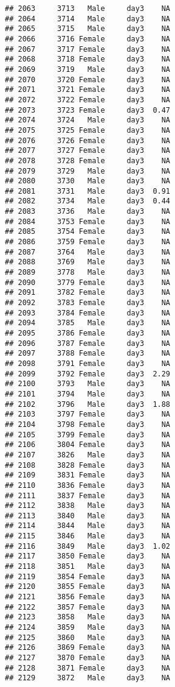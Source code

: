 \documentclass[
]{article}
\begin{document}
\begin{verbatim}
## 2063     3713   Male     day3    NA
## 2064     3714   Male     day3    NA
## 2065     3715   Male     day3    NA
## 2066     3716 Female     day3    NA
## 2067     3717 Female     day3    NA
## 2068     3718 Female     day3    NA
## 2069     3719   Male     day3    NA
## 2070     3720 Female     day3    NA
## 2071     3721 Female     day3    NA
## 2072     3722 Female     day3    NA
## 2073     3723 Female     day3  0.47
## 2074     3724   Male     day3    NA
## 2075     3725 Female     day3    NA
## 2076     3726 Female     day3    NA
## 2077     3727 Female     day3    NA
## 2078     3728 Female     day3    NA
## 2079     3729   Male     day3    NA
## 2080     3730   Male     day3    NA
## 2081     3731   Male     day3  0.91
## 2082     3734   Male     day3  0.44
## 2083     3736   Male     day3    NA
## 2084     3753 Female     day3    NA
## 2085     3754 Female     day3    NA
## 2086     3759 Female     day3    NA
## 2087     3764   Male     day3    NA
## 2088     3769   Male     day3    NA
## 2089     3778   Male     day3    NA
## 2090     3779 Female     day3    NA
## 2091     3782 Female     day3    NA
## 2092     3783 Female     day3    NA
## 2093     3784 Female     day3    NA
## 2094     3785   Male     day3    NA
## 2095     3786 Female     day3    NA
## 2096     3787 Female     day3    NA
## 2097     3788 Female     day3    NA
## 2098     3791 Female     day3    NA
## 2099     3792 Female     day3  2.29
## 2100     3793   Male     day3    NA
## 2101     3794   Male     day3    NA
## 2102     3796   Male     day3  1.88
## 2103     3797 Female     day3    NA
## 2104     3798 Female     day3    NA
## 2105     3799 Female     day3    NA
## 2106     3804 Female     day3    NA
## 2107     3826   Male     day3    NA
## 2108     3828 Female     day3    NA
## 2109     3831 Female     day3    NA
## 2110     3836 Female     day3    NA
## 2111     3837 Female     day3    NA
## 2112     3838   Male     day3    NA
## 2113     3840   Male     day3    NA
## 2114     3844   Male     day3    NA
## 2115     3846   Male     day3    NA
## 2116     3849   Male     day3  1.02
## 2117     3850 Female     day3    NA
## 2118     3851   Male     day3    NA
## 2119     3854 Female     day3    NA
## 2120     3855 Female     day3    NA
## 2121     3856 Female     day3    NA
## 2122     3857 Female     day3    NA
## 2123     3858   Male     day3    NA
## 2124     3859   Male     day3    NA
## 2125     3860   Male     day3    NA
## 2126     3869 Female     day3    NA
## 2127     3870 Female     day3    NA
## 2128     3871 Female     day3    NA
## 2129     3872   Male     day3    NA

\end{verbatim}
\end{document}
